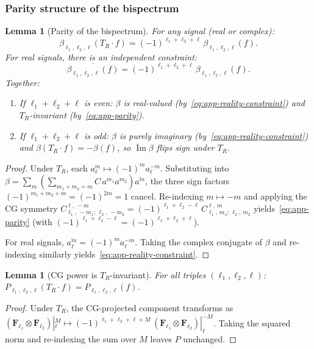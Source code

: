 \documentclass{article}
\newtheorem{lemma}[theorem]{Lemma}
\theoremstyle{definition}
\theoremstyle{remark}
\DeclareMathOperator{\im}{Im}
\newcommand{\CG}[6]{C^{#5,\,#6}_{#1,\,#2;\,#3,\,#4}}
\newcommand{\conj}[1]{\overline{#1}}
\theoremstyle{definition}
\begin{document}
\subsubsection{Parity structure of the bispectrum}

\begin{lemma}[Parity of the bispectrum]\label{lem:app-parity}
For any signal (real or complex):
\begin{equation}\label{eq:app-parity}
  \beta_{\ell_1,\ell_2,\ell}(T_R \cdot f)
  = (-1)^{\ell_1+\ell_2+\ell}\,\beta_{\ell_1,\ell_2,\ell}(f).
\end{equation}
For \emph{real} signals, there is an independent constraint:
\begin{equation}\label{eq:app-reality-constraint}
  \conj{\beta_{\ell_1,\ell_2,\ell}(f)}
  = (-1)^{\ell_1+\ell_2+\ell}\,\beta_{\ell_1,\ell_2,\ell}(f).
\end{equation}
Together:
\begin{enumerate}[nosep,label=(\alph*)]
\item If $\ell_1+\ell_2+\ell$ is even:
  $\beta$ is real-valued (by~\eqref{eq:app-reality-constraint})
  and $T_R$-invariant (by~\eqref{eq:app-parity}).
\item If $\ell_1+\ell_2+\ell$ is odd:
  $\beta$ is purely imaginary (by~\eqref{eq:app-reality-constraint})
  and $\beta(T_R \cdot f) = -\beta(f)$, so $\im\beta$ flips sign under $T_R$.
\end{enumerate}
\end{lemma}
\begin{proof}
Under $T_R$, each $a_\ell^m \mapsto (-1)^m a_\ell^{-m}$.
Substituting into $\beta = \sum_m (\sum_{m_1+m_2=m} C\, a^{m_1} a^{m_2})
\conj{a^m}$, the three sign factors $(-1)^{m_1+m_2+m} = (-1)^{2m} = 1$
cancel. Re-indexing $m \mapsto -m$ and applying the CG symmetry
$\CG{\ell_1}{-m_1}{\ell_2}{-m_2}{\ell}{-m}
  = (-1)^{\ell_1+\ell_2-\ell}\,\CG{\ell_1}{m_1}{\ell_2}{m_2}{\ell}{m}$
yields~\eqref{eq:app-parity} (with $(-1)^{\ell_1+\ell_2-\ell} = (-1)^{\ell_1+\ell_2+\ell}$).

For real signals, $\conj{a_\ell^m} = (-1)^m a_\ell^{-m}$.
Taking the complex conjugate of $\beta$ and re-indexing similarly
yields~\eqref{eq:app-reality-constraint}.
\end{proof}

\begin{lemma}[CG power is $T_R$-invariant]\label{lem:app-P-invariant}
For all triples $(\ell_1,\ell_2,\ell)$:
$P_{\ell_1,\ell_2,\ell}(T_R \cdot f) = P_{\ell_1,\ell_2,\ell}(f)$.
\end{lemma}
\begin{proof}
Under $T_R$, the CG-projected component transforms as
$(\mathbf{F}_{\ell_1} \otimes \mathbf{F}_{\ell_2})|_\ell^M
  \mapsto (-1)^{\ell_1+\ell_2+\ell+M}\,
  (\mathbf{F}_{\ell_1} \otimes \mathbf{F}_{\ell_2})|_\ell^{-M}$.
Taking the squared norm and re-indexing the sum over $M$
leaves $P$ unchanged.
\end{proof}
\end{document}
